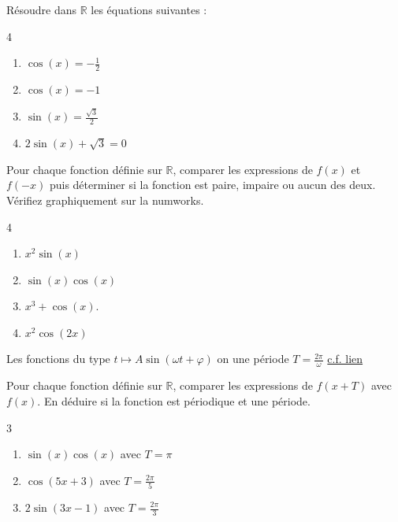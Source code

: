 \documentclass[main.tex]{subfiles}
\begin{document}
\begin{exercise}[\cancel{\faCalculator}]  Résoudre dans $\mathbb{R}$ les équations suivantes :\hfill 
	\vspace{-1em}
	\begin{multicols}{4}
		\begin{enumerate}[label={$(E_{\arabic*})$}, leftmargin=*]
			\item $\cos(x)=-\tfrac{1}{2}$
			\item $\cos(x)=-1$
			\item $\sin(x)=\tfrac{\sqrt{3}}{2}$
			\item $2\sin(x)+\sqrt{3}=0$
		\end{enumerate} \vspace{-1em}
	\end{multicols}   
\end{exercise}
\begin{exercise}[parité] Pour chaque fonction définie sur $\mathbb{R}$, comparer les expressions de $f(x)$ et $f(-x)$ puis déterminer si la fonction est paire, impaire ou aucun des deux. Vérifiez graphiquement sur la numworks.
	\vspace{-0.5em}
\begin{multicols}{4}
	\begin{enumerate}[ label={$f_{\arabic*}(x)=$},leftmargin=*]
		\item $x^2\sin(x)$
		\item $\sin(x)\cos(x)$
		\item $x^3+\cos(x)$.
		\item $x^2\cos(2x)$
	\end{enumerate}	\vspace{-1em}
\end{multicols}
\end{exercise}
\begin{eBox}
	Les fonctions du type $t\mapsto A\sin(\omega t+\varphi)$ on une période $T=\tfrac{2\pi}{\omega}$ \href{https://www.desmos.com/calculator/aedicceo7x}{c.f. lien}
\end{eBox}
\begin{exercise} Pour chaque fonction définie sur $\mathbb{R}$, comparer les expressions de $f(x+T)$ avec $f(x)$. En déduire si la fonction est périodique et une période. 	\vspace{-0.5em}
\begin{multicols}{3}
	\begin{enumerate}[ label={$f_{\arabic*}(x)=$},leftmargin=*]
		\item $\sin(x)\cos(x)$ avec $T=\pi$
		\item $\cos(5x+3)$ avec $T=\tfrac{2\pi}{5}$
		\item $2\sin(3x-1)$  avec $T=\tfrac{2\pi}{3}$ 
	\end{enumerate}	\vspace{-0.5em}
\end{multicols}
\end{exercise}
\end{document}
